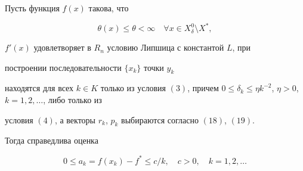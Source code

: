 \begin{thm}


Пусть функция $f(x)$ такова, что


\begin{equation}


\theta (x)\le \theta <\infty \quad \forall x\in X^{0}_{\delta}\setminus X^*,


\end{equation}


${f}'(x)$ удовлетворяет в $R_n$ условию Липшица с константой $L$, при


построении последовательности $\{{x_k} \}$ точки $y_k$


находятся для всех $k\in K$ только из условия $(3)$, причем $0\le \delta_k


\le \eta k^{-2}$, $\eta >0$, $k=1,2,\dotsc$, либо только из


условия $(4)$, а векторы $r_k$, $p_k$ выбираются согласно $(18)$, $(19)$.


Тогда справедлива оценка


\begin{equation}


0\le a_k =f(x_k)-f^*\le c/k,\quad c>0,\quad k=1,2,\dotsc


\end{equation}


\end{thm}






